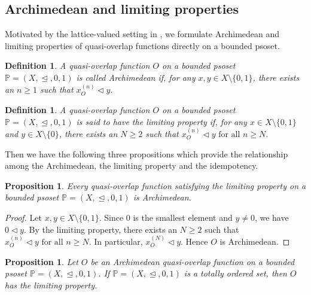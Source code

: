 \documentclass[preprint,12pt]{elsarticle}
\newtheorem{proposition}[theorem]{Proposition}
\newtheorem{definition}[theorem]{Definition}
\begin{document}
\subsection{Archimedean and limiting properties}

Motivated by the lattice-valued setting in \cite{Paiva2021}, we formulate Archimedean and limiting properties of quasi-overlap functions directly on a bounded psoset.
\begin{definition}\label{def:archimedean}
\emph{A quasi-overlap function $O$ on a bounded psoset $\mathbb{P}=(X,\trianglelefteq,0,1)$ is called \emph{Archimedean} if, for any $x,y\in X\setminus\{0,1\}$, there exists an $n\ge1$ such that
$x_O^{(n)}\triangleleft y.$}
\end{definition}

\begin{definition}\label{def:order-limiting}
\emph{A quasi-overlap function $O$ on a bounded psoset $\mathbb{P}=(X,\trianglelefteq,0,1)$ is said to have the \emph{limiting property} if, for any $x\in X\setminus\{0,1\}$ and $y\in X\setminus\{0\}$, there exists an $N\ge2$ such that
$x_O^{(n)}\triangleleft y
\mbox{ for all }n\ge N.$}
\end{definition}

Then we have the following three propositions which provide the relationship among the Archimedean, the limiting property and the idempotency.
\begin{proposition}\label{prop:limiting-implies-arch}
Every quasi-overlap function satisfying the limiting property on a bounded psoset $\mathbb{P}=(X,\trianglelefteq,0,1)$ is Archimedean.
\end{proposition}

\begin{proof}
Let $x,y\in X\setminus\{0,1\}$. Since $0$ is the smallest element and $y\neq0$, we have $0\triangleleft y$. By the limiting property, there exists an $N\ge2$ such that
$
x_O^{(n)}\triangleleft y
\mbox{ for all }n\ge N.
$
In particular, $x_O^{(N)}\triangleleft y.$ Hence $O$ is Archimedean.
\end{proof}
\begin{proposition}\label{prop:arch-limiting}
Let $O$ be an Archimedean quasi-overlap function on a bounded psoset
$\mathbb{P}=(X,\trianglelefteq,0,1)$. If $\mathbb{P}=(X,\trianglelefteq,0,1)$ is a totally ordered set, then $O$ has the limiting property.
\end{proposition}
\end{document}

